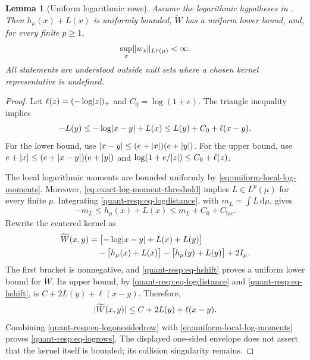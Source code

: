 \documentclass[11pt,reqno]{amsart}
\numberwithin{equation}{section}
\theoremstyle{plain}
\newtheorem{lemma}[lemma]{Lemma}
\theoremstyle{remark}
\DeclarePairedDelimiter{\abs}{\lvert}{\rvert}
\DeclarePairedDelimiter{\norm}{\lVert}{\rVert}
\newcommand{\md}{\mathrm{d}}
\newcommand{\tl}{\widetilde}
\begin{document}
\begin{lemma}[Uniform logarithmic rows]\label{quant-resp:lem-logrows}
Assume the logarithmic hypotheses in . Then $h_\mu(x)+L(x)$ is uniformly bounded, $\tl W$ has a uniform lower bound, and, for every finite $p\geq1$,
\begin{equation}\label{quant-resp:eq-logrows}
 \sup_x\norm{w_x}_{L^p(\mu)}<\infty.
\end{equation}
All statements are understood outside null sets where a chosen kernel representative is undefined.
\end{lemma}
\begin{proof}
Let $\ell(z)=(-\log\abs z)_+$ and $C_0=\log(1+e)$. The triangle inequality implies
\begin{equation}\label{quant-resp:eq-logdistance}
 -L(y)\leq-\log\abs{x-y}+L(x)\leq L(y)+C_0+\ell(x-y).
\end{equation}
For the lower bound, use $\abs{x-y}\leq(e+\abs x)(e+\abs y)$. For the upper bound, use $e+\abs x\leq(e+\abs{x-y})(e+\abs y)$ and
$\log(1+e/\abs z)\leq C_0+\ell(z)$.

The local logarithmic moments are bounded uniformly by \eqref{eq:uniform-local-log-moments}.
Moreover, \eqref{eq:exact-log-moment-threshold} implies $L\in L^p(\mu)$ for every finite $p$. Integrating \eqref{quant-resp:eq-logdistance}, with $m_L=\int L\,\md\mu$, gives
\begin{equation}\label{quant-resp:eq-hshift}
 -m_L\leq h_\mu(x)+L(x)\leq m_L+C_0+C_{\mathrm{loc}}.
\end{equation}
Rewrite the centered kernel as
\begin{align}
 \tl W(x,y)
 &=\bigl[-\log\abs{x-y}+L(x)+L(y)\bigr]\notag\\
 &\quad-\bigl[h_\mu(x)+L(x)\bigr]-\bigl[h_\mu(y)+L(y)\bigr]+2I_\mu.
 \label{quant-resp:eq-logcenteredcancel}
\end{align}
The first bracket is nonnegative, and \eqref{quant-resp:eq-hshift} proves a uniform lower bound for $\tl W$. Its upper bound, by \eqref{quant-resp:eq-logdistance} and \eqref{quant-resp:eq-hshift}, is $C+2L(y)+\ell(x-y)$. Therefore,
\begin{equation}\label{quant-resp:eq-logonesidedrow}
 \abs{\tl W(x,y)}\leq C+2L(y)+\ell(x-y).
\end{equation}
Combining \eqref{quant-resp:eq-logonesidedrow} with \eqref{eq:uniform-local-log-moments} proves \eqref{quant-resp:eq-logrows}. The displayed one-sided envelope does not assert that the kernel itself is bounded; its collision singularity remains.
\end{proof}
\end{document}
